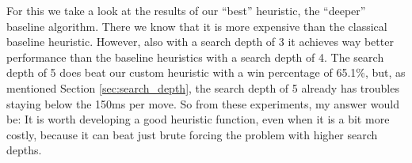 \documentclass[aps,prd,notitlepage,floatfix,superscriptaddress,groupedaddress,nofootinbib]{revtex4-1}
\begin{document}
For this we take a look at the results of our ``best'' heuristic, the ``deeper'' baseline algorithm. There we know that it is more expensive than the classical baseline heuristic. However, also with a search depth of 3 it achieves way better performance than the baseline heuristics with a search depth of 4. The search depth of 5 does beat our custom heuristic with a win percentage of 65.1\%, but, as mentioned Section \ref{sec:search_depth}, the search depth of 5 already has troubles staying below the 150ms per move. So from these experiments, my answer would be: It is worth developing a good heuristic function, even when it is a bit more costly, because it can beat just brute forcing the problem with higher search depths.




%

\end{document}
